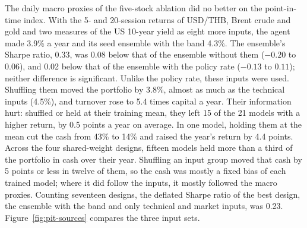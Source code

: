 The daily macro proxies of the five-stock ablation did no better on the point-in-time index. With the
5- and 20-session returns of USD/THB, Brent crude and gold and two measures of the US 10-year yield as
eight more inputs, the agent made 3.9\% a year and its seed ensemble with the band 4.3\%. The
ensemble's Sharpe ratio, 0.33, was 0.08 below that of the ensemble without them ($-0.20$ to $0.06$),
and 0.02 below that of the ensemble with the policy rate ($-0.13$ to $0.11$); neither difference is
significant. Unlike the policy rate, these inputs were used. Shuffling them moved the portfolio by
3.8\%, almost as much as the technical inputs (4.5\%), and turnover rose to 5.4 times capital a year.
Their information hurt: shuffled or held at their training mean, they left 15 of the 21 models with a
higher return, by 0.5 points a year on average. In one model, holding them at the mean cut the cash
from 43\% to 14\% and raised the year's return by 4.4 points. Across the four shared-weight designs,
fifteen models held more than a third of the portfolio in cash over their year. Shuffling an input
group moved that cash by 5 points or less in twelve of them, so the cash was mostly a fixed bias of
each trained model; where it did follow the inputs, it mostly followed the macro proxies. Counting
seventeen designs, the deflated Sharpe ratio of the best design, the ensemble with the band and only
technical and market inputs, was 0.23. Figure~\ref{fig:pit-sources} compares the three input sets.

